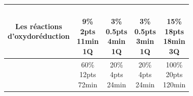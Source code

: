 \documentclass[12pt]{article}
\begin{document}
\begin{center}
\begin{tabular}{|c||c|c|c|c|}
    \makecell{Les réactions \\d’oxydoréduction }
    &\makecell{\\9\%\\2pts\\11min\\1Q}  & \makecell{\\3\%\\0.5pts\\4min\\1Q}  &\makecell{\\3\%\\0.5pts\\3min\\1Q } & \makecell{\\15\%\\18pts\\18min\\3Q} \\\hline
    



    &\makecell{60\%\\12pts\\72min}  & \makecell{20\%\\4pts\\24min}  &\makecell{20\%\\4pts\\24min } & \makecell{100\%\\20pts\\120min} \\\hline

\end{tabular} 
\end{center}

\end{document}
